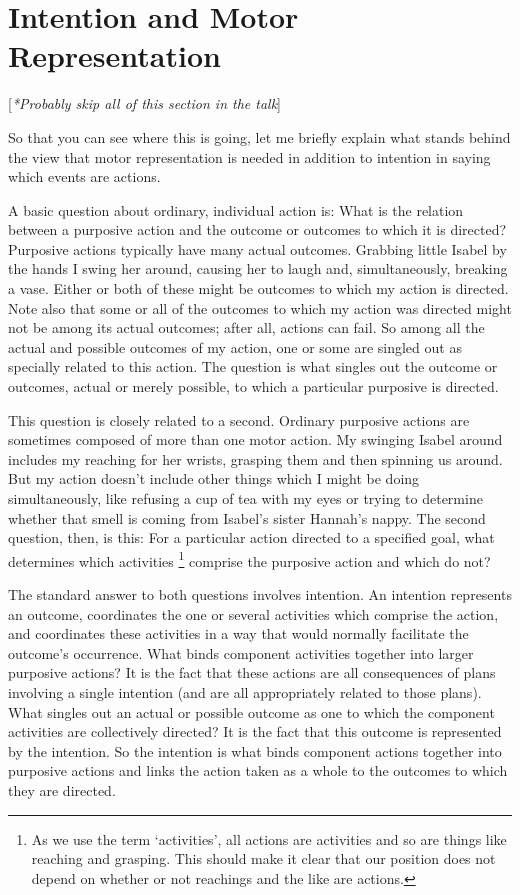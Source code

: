 \documentclass[12pt,\papersize]{extarticle}
\begin{document}
\section{Intention and Motor Representation}
\label{sec:individual_action_motor_representation}
[\emph{*Probably skip all of this section in the talk}]

So that you can see where this is going, let me briefly explain what stands behind the view that motor representation is needed in addition to intention in saying which events are actions.

A basic question about ordinary, individual action is:
What is the relation between a purposive action and the outcome or outcomes to which it is directed?
Purposive actions typically have many actual outcomes.
Grabbing little Isabel by the hands I swing her around, causing her to laugh and, simultaneously, breaking a vase.
Either or both of these might be outcomes to which my action is directed.
Note also that some or all of the outcomes to which my action was directed might not be among its actual outcomes; after all, actions can fail.
So among all the actual and possible outcomes of my action, one or some are singled out as specially related to this action.
The question is what singles out the outcome or outcomes, actual or merely possible, to which a particular purposive is directed.

This question is closely related to a second.
Ordinary purposive actions are sometimes composed of more than one motor action.  My swinging Isabel around includes my reaching for her wrists, grasping them and then spinning us around.  
But  my action doesn’t include other things which I might be doing simultaneously, like refusing a cup of tea with my eyes or  trying to determine whether that smell is coming from Isabel’s sister Hannah’s nappy.
The second question, then, is this: For a particular action directed to a specified goal, what determines which activities%
\footnote{
As we use the term `activities',
all actions are activities 
and so are  things like reaching and grasping.
This should make it clear that our position does not depend on whether or not reachings and the like are  actions.
} 
comprise the purposive action and which do not?

The standard answer to both questions involves intention.
An intention represents an outcome, coordinates the one or several activities which comprise the action, and coordinates these activities in a way that would normally facilitate the outcome's occurrence.
What binds component activities together into larger purposive actions?  
It is the fact that these actions are all consequences of plans involving a single intention (and are all appropriately related to those plans).
What singles out an actual or possible outcome as one to which the component activities are collectively directed?  
It is the fact that this outcome is represented by the intention.
So the intention is what binds component actions together into purposive actions and links the action taken as a whole to the outcomes to which they are directed.
\end{document}

